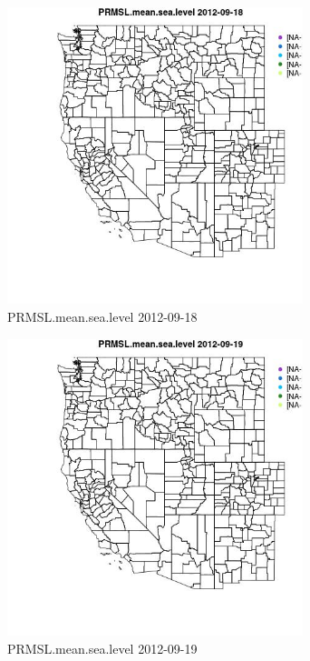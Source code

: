 \begin{figure} 
\centering  
\includegraphics[width=0.77\textwidth]{Code_Outputs/ML_input_report_ML_input_PM25_Step5_part_d_de_duplicated_aves_ML_input_MapObsPRMSLmeansealevel2012-09-18.jpg} 
\caption{\label{fig:ML_input_report_ML_input_PM25_Step5_part_d_de_duplicated_aves_ML_inputMapObsPRMSLmeansealevel2012-09-18}PRMSL.mean.sea.level 2012-09-18} 
\end{figure} 
 

\begin{figure} 
\centering  
\includegraphics[width=0.77\textwidth]{Code_Outputs/ML_input_report_ML_input_PM25_Step5_part_d_de_duplicated_aves_ML_input_MapObsPRMSLmeansealevel2012-09-19.jpg} 
\caption{\label{fig:ML_input_report_ML_input_PM25_Step5_part_d_de_duplicated_aves_ML_inputMapObsPRMSLmeansealevel2012-09-19}PRMSL.mean.sea.level 2012-09-19} 
\end{figure} 
 

